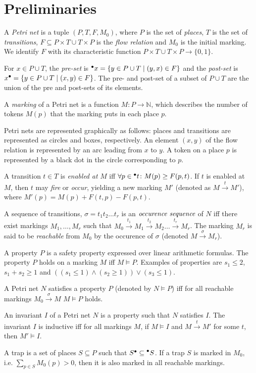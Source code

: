 \section{Preliminaries}

A \emph{Petri net} is a tuple $(P, T, F, M_0)$, where $P$ is the set of
\emph{places}, $T$ is the set of \emph{transitions},
$F \subseteq P\times T \cup T\times P$ is the \emph{flow relation}
and $M_0$ is the initial marking.
We identify $F$ with its characteristic function
$P\times T \cup T\times P \to \{0, 1\}$.

For $x\in P\cup T$, the \emph{pre-set} is
$\prescript{\bullet}{}{x}=\{y\in P\cup T\mid (y,x) \in F\}$
and the \emph{post-set} is $x^{\bullet}=\{y\in P\cup T\mid (x,y) \in F\}$.
The pre- and post-set of a subset of $P \cup T$ are the union of
the pre and post-sets of its elements.

A \emph{marking} of a Petri net is a function $M\colon P \to \mathbb{N}$,
which describes the number of tokens $M(p)$ that the marking puts in
each place $p$.

Petri nets are represented graphically as follows: places and transitions
are represented as circles and boxes, respectively. An element $(x,y)$
of the flow relation is represented by an arc leading from $x$ to $y$.
A token on a place $p$ is represented by a black dot in the circle
corresponding to $p$.

A transition $t \in T$ is \emph{enabled at $M$} iff
$\forall p \in \prescript{\bullet}{}{t} \colon M(p) \ge F(p, t)$.
If $t$ is enabled at $M$, then $t$ may \emph{fire} or \emph{occur},
yielding a new marking $M'$ (denoted as $M \xrightarrow{t} M'$),
where $M'(p) = M(p) + F(t,p) - F(p,t)$.

A sequence of transitions, $\sigma = t_1 t_2 \ldots t_r$ is an
$\emph{occurence sequence}$ of $N$ iff there exist markings
$M_1, \ldots, M_r$ such that $M_0 \xrightarrow{t_1} M_1
\xrightarrow{t_2} M_2 \ldots \xrightarrow{t_r} M_r$. The marking
$M_r$ is said to be \emph{reachable} from $M_0$ by the occurence
of $\sigma$ (denoted $M \xrightarrow{\sigma} M_r$).

A property $P$ is a safety property expressed over linear arithmetic
formulas. The property $P$ holds on a marking $M$ iff $M \models P$.
Examples of properties are $s_1 \le 2$, $s_1 + s_2 \ge 1$ and
$((s_1 \le 1) \land (s_2 \ge 1)) \lor (s_3 \le 1)$.

A Petri net $N$ satisfies a property $P$ (denoted by $N \models P$)
iff for all reachable markings $M_0 \xrightarrow{\sigma} M$
$M \models P$ holds.

An invariant $I$ of a Petri net $N$ is a property such that $N$ satisfies $I$.
The invariant $I$ is inductive iff for all markings
$M$, if $M \models I$ and $M \xrightarrow{t} M'$ for some $t$, then
$M' \models I$.

A trap is a set of places $S \subseteq P$ such that $S^{\bullet} \subseteq \prescript{\bullet}{}{S}$.
If a trap $S$ is marked in $M_0$, i.e. $\sum_{p \in S} M_0(p) > 0$, then it is also marked in all reachable markings.

